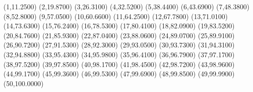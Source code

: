 (1,11.2500) (2,19.8700) (3,26.3100) (4,32.5200) (5,38.4400) (6,43.6900) (7,48.3800) (8,52.8000) (9,57.0500) (10,60.6600) (11,64.2500) (12,67.7800) (13,71.0100) (14,73.6300) (15,76.2400) (16,78.5300) (17,80.4100) (18,82.0900) (19,83.5200) (20,84.7600) (21,85.9300) (22,87.0400) (23,88.0600) (24,89.0700) (25,89.9100) (26,90.7200) (27,91.5300) (28,92.3000) (29,93.0500) (30,93.7300) (31,94.3100) (32,94.8800) (33,95.4300) (34,95.9800) (35,96.4100) (36,96.7900) (37,97.1700) (38,97.5200) (39,97.8500) (40,98.1700) (41,98.4500) (42,98.7200) (43,98.9600) (44,99.1700) (45,99.3600) (46,99.5300) (47,99.6900) (48,99.8500) (49,99.9900) (50,100.0000) 